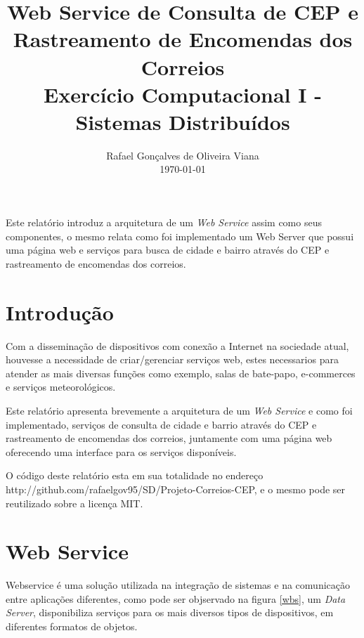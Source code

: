\documentclass[12pt]{article}
\title{Web Service de Consulta de CEP e Rastreamento de Encomendas dos Correios  \\ Exercício Computacional I - Sistemas Distribuídos}
\author{Rafael Gonçalves de Oliveira Viana\inst{1} \\\vspace*{10pt} \normalsize  \today{} }
\begin{document}
 

\maketitle

     
\begin{resumo} 	
  Este relatório introduz a arquitetura de um \textit{Web Service} assim como seus componentes, o mesmo relata como foi implementado um Web Server que possui uma página web e serviços para busca de cidade e bairro através do CEP e rastreamento de encomendas dos correios.
\end{resumo}



\section{Introdução}
  Com a disseminação de dispositivos com conexão a Internet na sociedade atual, houvesse a necessidade de criar/gerenciar serviços web, estes necessarios para atender as mais diversas funções como exemplo, salas de bate-papo, e-commerces e serviços meteorológicos.
  
  Este relatório apresenta brevemente a arquitetura de um \textit{Web Service} e como foi implementado, serviços de consulta de cidade e barrio através do CEP e rastreamento de encomendas dos correios, juntamente com uma página web oferecendo uma interface para os serviços disponíveis.
  
  O código deste relatório esta em sua totalidade no endereço http://github.com/rafaelgov95/SD/Projeto-Correios-CEP, e o mesmo pode ser reutilizado sobre a licença MIT.
\section{Web Service}
Webservice é uma solução utilizada na integração de sistemas e na comunicação entre aplicações diferentes, como pode ser objservado na figura \ref{wbs}, um \textit{Data Server}, disponibiliza serviços para os mais diversos tipos de dispositivos, em diferentes formatos de objetos.
\end{document}
